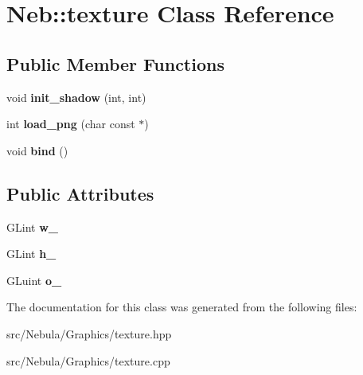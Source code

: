 \hypertarget{classNeb_1_1texture}{\section{\-Neb\-:\-:texture \-Class \-Reference}
\label{classNeb_1_1texture}
}
\subsection*{\-Public \-Member \-Functions}
\begin{DoxyCompactItemize}
\item 
\hypertarget{classNeb_1_1texture_a8d6a7a7332cf05a9ff3509b67a9a3a7d}{void {\bfseries init\-\_\-shadow} (int, int)}\label{classNeb_1_1texture_a8d6a7a7332cf05a9ff3509b67a9a3a7d}

\item 
\hypertarget{classNeb_1_1texture_a39629a65ae9946daf7ed8659feca3ed9}{int {\bfseries load\-\_\-png} (char const $\ast$)}\label{classNeb_1_1texture_a39629a65ae9946daf7ed8659feca3ed9}

\item 
\hypertarget{classNeb_1_1texture_ac5e8baf87aef739ebcc9e4c81e6d1c98}{void {\bfseries bind} ()}\label{classNeb_1_1texture_ac5e8baf87aef739ebcc9e4c81e6d1c98}

\end{DoxyCompactItemize}
\subsection*{\-Public \-Attributes}
\begin{DoxyCompactItemize}
\item 
\hypertarget{classNeb_1_1texture_a5906c4fa0e792b2248962d2dd06508d7}{\-G\-Lint {\bfseries w\-\_\-}}\label{classNeb_1_1texture_a5906c4fa0e792b2248962d2dd06508d7}

\item 
\hypertarget{classNeb_1_1texture_ad7caf7e0f403d4e13fde5bd19761dd8a}{\-G\-Lint {\bfseries h\-\_\-}}\label{classNeb_1_1texture_ad7caf7e0f403d4e13fde5bd19761dd8a}

\item 
\hypertarget{classNeb_1_1texture_a200e3dfdfa5616cba3ef97b63cbe3a54}{\-G\-Luint {\bfseries o\-\_\-}}\label{classNeb_1_1texture_a200e3dfdfa5616cba3ef97b63cbe3a54}

\end{DoxyCompactItemize}


\-The documentation for this class was generated from the following files\-:\begin{DoxyCompactItemize}
\item 
src/\-Nebula/\-Graphics/texture.\-hpp\item 
src/\-Nebula/\-Graphics/texture.\-cpp\end{DoxyCompactItemize}
